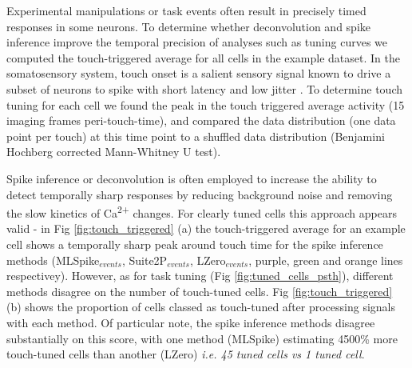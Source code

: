 \documentclass[a4paper,10pt,twocolumn]{article}
\begin{document}
Experimental manipulations or task events often result in precisely timed responses in some neurons. To determine whether deconvolution and spike inference improve the temporal precision of analyses such as tuning curves we computed the touch-triggered average for all cells in the example dataset. In the somatosensory system, touch onset is a salient sensory signal known to drive a subset of neurons to spike with short latency and low jitter \citep{OConnor2010-hd, Hires2015-by}. To determine touch tuning for each cell we found the peak in the touch triggered average activity (15 imaging frames peri-touch-time), and compared the data distribution (one data point per touch) at this time point to a shuffled data distribution (Benjamini Hochberg corrected Mann-Whitney U test). 

Spike inference or deconvolution is often employed to increase the ability to detect temporally sharp responses by reducing background noise and removing the slow kinetics of Ca\textsuperscript{2+} changes. For clearly tuned cells this approach appears valid - in Fig \ref{fig:touch_triggered} (a) the touch-triggered average for an example cell shows a temporally sharp peak around touch time for the spike inference methods (MLSpike$_{events}$, Suite2P$_{events}$, LZero$_{events}$, purple, green and orange lines respectivey). However, as for task tuning (Fig \ref{fig:tuned_cells_psth}), different methods disagree on the number of touch-tuned cells. Fig \ref{fig:touch_triggered} (b) shows the proportion of cells classed as touch-tuned after processing signals with each method. Of particular note, the spike inference methods disagree substantially on this score, with one method (MLSpike) estimating 4500\% more touch-tuned cells than another (LZero) \emph{i.e. 45 tuned cells vs 1 tuned cell}. 


\end{document}

